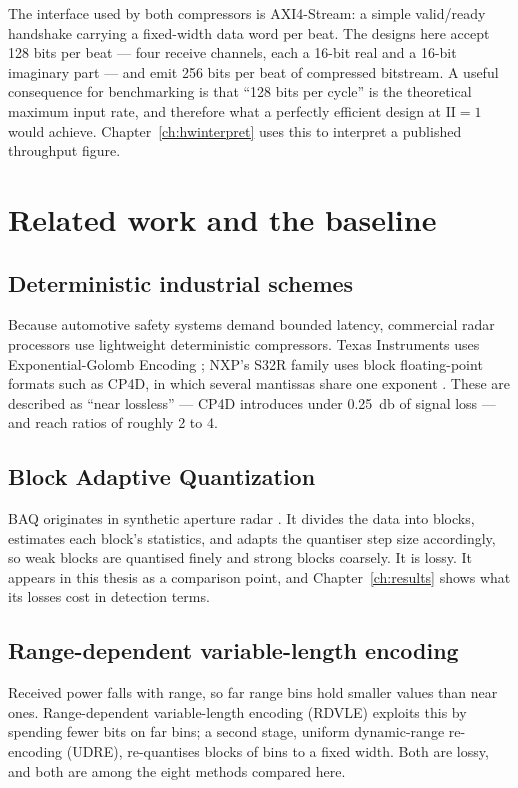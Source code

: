 The interface used by both compressors is AXI4-Stream: a simple
valid/ready handshake carrying a fixed-width data word per beat. The designs
here accept \num{128} bits per beat --- four receive channels, each a 16-bit
real and a 16-bit imaginary part --- and emit \num{256} bits per beat of
compressed bitstream. A useful consequence for benchmarking is that
``\num{128} bits per cycle'' is the theoretical maximum input rate, and
therefore what a perfectly efficient design at $\mathrm{II}=1$ would achieve.
Chapter~\ref{ch:hwinterpret} uses this to interpret a published throughput
figure.

\section{Related work and the baseline}
\label{sec:sota}

\subsection{Deterministic industrial schemes}

Because automotive safety systems demand bounded latency, commercial radar
processors use lightweight deterministic compressors. Texas Instruments uses
Exponential-Golomb Encoding \cite{ti_ege}; NXP's S32R family uses block
floating-point formats such as CP4D, in which several mantissas share one
exponent \cite{nxp_an5375}. These are described as ``near lossless'' --- CP4D
introduces under \SI{0.25}{\decibel} of signal loss --- and reach ratios of
roughly \num{2} to \num{4}.

\subsection{Block Adaptive Quantization}

BAQ originates in synthetic aperture radar \cite{kwok1989}. It divides the data
into blocks, estimates each block's statistics, and adapts the quantiser step
size accordingly, so weak blocks are quantised finely and strong blocks
coarsely. It is lossy. It appears in this thesis as a comparison point, and
Chapter~\ref{ch:results} shows what its losses cost in detection terms.

\subsection{Range-dependent variable-length encoding}

Received power falls with range, so far range bins hold smaller values than
near ones. Range-dependent variable-length encoding (RDVLE) \cite{li2014}
exploits this by spending fewer bits on far bins; a second stage, uniform
dynamic-range re-encoding (UDRE), re-quantises blocks of bins to a fixed width.
Both are lossy, and both are among the eight methods compared here.

